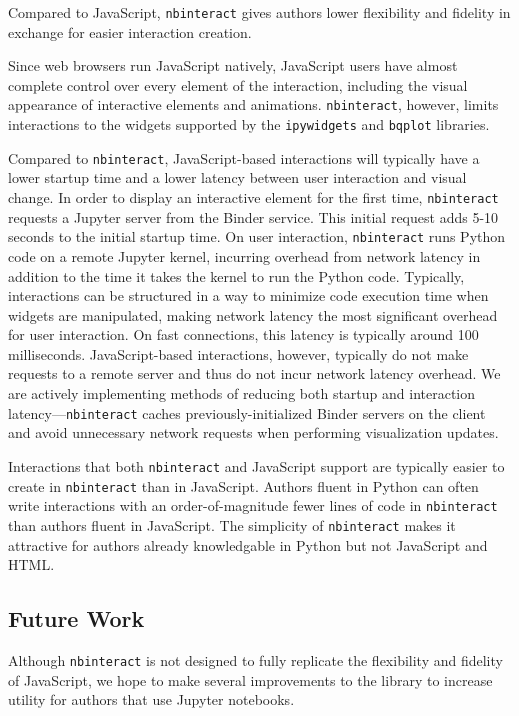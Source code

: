 \documentclass[nobib]{tufte-handout}
\newcommand{\code}[1]{\texttt{#1}}
\begin{document}
Compared to JavaScript, \code{nbinteract} gives authors lower flexibility and
fidelity in exchange for easier interaction creation.

Since web browsers run JavaScript natively, JavaScript users have almost
complete control over every element of the interaction, including the visual
appearance of interactive elements and animations. \code{nbinteract}, however,
limits interactions to the widgets supported by the \code{ipywidgets} and
\code{bqplot} libraries.

Compared to \code{nbinteract}, JavaScript-based interactions will typically
have a lower startup time and a lower latency between user interaction and
visual change. In order to display an interactive element for the first time,
\code{nbinteract} requests a Jupyter server from the Binder service. This
initial request adds 5-10 seconds to the initial startup time. On user
interaction, \code{nbinteract} runs Python code on a remote Jupyter kernel,
incurring overhead from network latency in addition to the time it takes the
kernel to run the Python code. Typically, interactions can be structured in a
way to minimize code execution time when widgets are manipulated, making
network latency the most significant overhead for user interaction. On fast
connections, this latency is typically around 100 milliseconds.
JavaScript-based interactions, however, typically do not make requests to a
remote server and thus do not incur network latency overhead. We are actively
implementing methods of reducing both startup and interaction
latency---\code{nbinteract} caches previously-initialized Binder servers on the
client and avoid unnecessary network requests when performing visualization
updates.

Interactions that both \code{nbinteract} and JavaScript support are typically
easier to create in \code{nbinteract} than in JavaScript. Authors fluent in
Python can often write interactions with an order-of-magnitude fewer lines of
code in \code{nbinteract} than authors fluent in JavaScript. The simplicity of
\code{nbinteract} makes it attractive for authors already knowledgable in
Python but not JavaScript and HTML.


\subsection{Future Work} %
\label{sub:future_work}

Although \code{nbinteract} is not designed to fully replicate the flexibility
and fidelity of JavaScript, we hope to make several improvements to the library
to increase utility for authors that use Jupyter notebooks.
\end{document}
